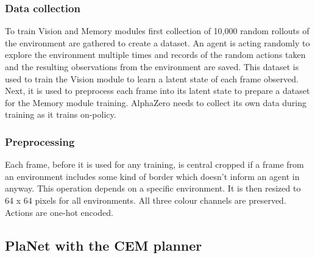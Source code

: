 \subsubsection{Data collection}
To train Vision and Memory modules first collection of 10,000 random rollouts of the environment are gathered to create a dataset. An agent is acting randomly to explore the environment multiple times and records of the random actions taken and the resulting observations from the environment are saved.
This dataset is used to train the Vision module to learn a latent state of each frame observed. Next, it is used to preprocess each frame into its latent state to prepare a dataset for the Memory module training.
AlphaZero needs to collect its own data during training as it trains on-policy.

\subsubsection{Preprocessing}
Each frame, before it is used for any training, is central cropped if a frame from an environment includes some kind of border which doesn't inform an agent in anyway. This operation depends on a specific environment. It is then resized to 64 x 64 pixels for all environments. All three colour channels are preserved. Actions are one-hot encoded.

\subsection{PlaNet with the CEM planner}

